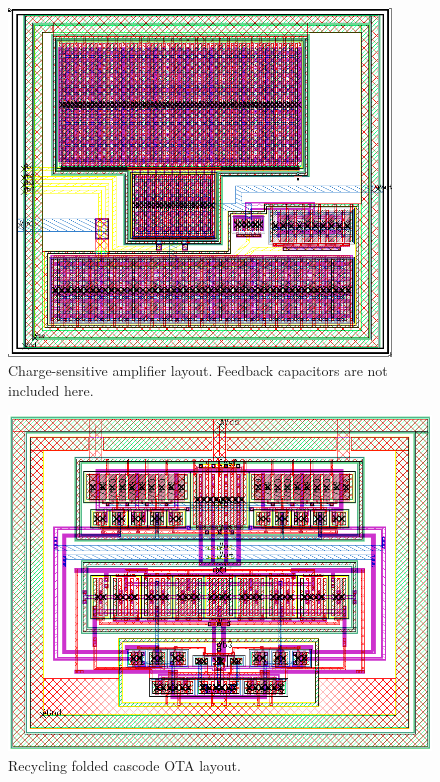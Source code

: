 \begin{figure}[!p]
	\centering
	\includegraphics[width=4in]{./Figures/CSA_layout}
	\caption{Charge-sensitive amplifier layout. Feedback capacitors are not included here.}\label{fig:csa_layout}
\end{figure}

\begin{figure}[!t]
	\centering
	\includegraphics[width=4.5in]{./Figures/OTA_layout}
	\caption{Recycling folded cascode OTA layout.}\label{fig:ota_layout}
\end{figure}

